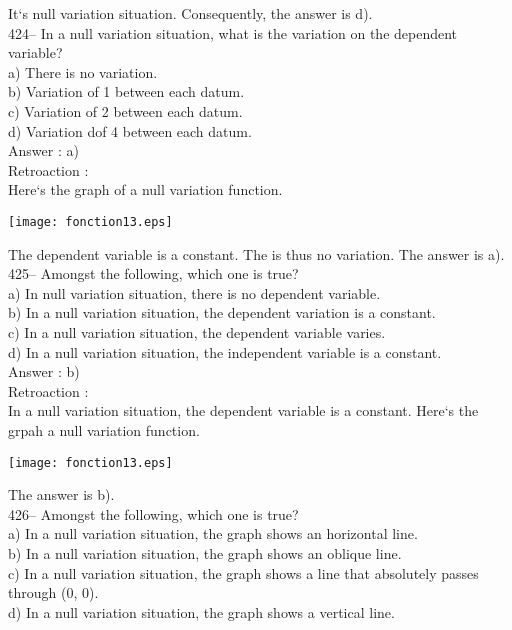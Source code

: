 ﻿\documentclass[letterpaper, 12pt]{article}
\begin{document}
It`s null variation situation.  Consequently, the answer is d).\\

424-- In a null variation situation, what is the variation on the dependent variable?\\
a) There is no variation.\\
b) Variation of 1 between each datum.\\
c) Variation of 2 between each datum.\\
d) Variation dof 4 between each datum.\\

Answer :  a)\\

Retroaction : \\
Here`s the graph of a null variation function.\\
    \begin{center}
    \texttt{[image: fonction13.eps]}
    \end{center}
The dependent variable is a constant. The is thus no variation.
  The answer is a).\\

425-- Amongst the following, which one is true?\\
a) In null variation situation, there is no dependent variable.\\
b) In a null variation situation, the dependent variation is a constant.\\
c) In a null variation situation, the dependent variable varies.\\
d) In a null variation situation, the independent variable is a constant.\\


Answer :  b)\\

Retroaction : \\
In a null variation situation, the dependent variable is a constant. Here`s the grpah a null variation function.\\
    \begin{center}
    \texttt{[image: fonction13.eps]}
    \end{center}

The answer is b).\\

426-- Amongst the following, which one is true?\\
a) In a null variation situation, the graph shows an horizontal line.\\
b) In a null variation situation, the graph shows an oblique line.\\
c) In a null variation situation, the graph shows a line that absolutely passes through (0, 0).\\
d) In a null variation situation, the graph shows a vertical line.\\
\end{document}

